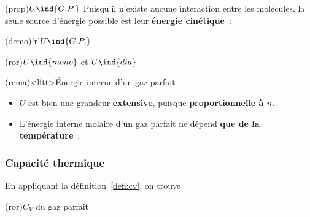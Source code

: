\documentclass[../../main/main.tex]{subfiles}
\begin{document}
\begin{tcbraster}[raster equal height=rows, raster columns=2]
	\begin{tcb*}(prop){$U\ind{G.P.}$}
		Puisqu'il n'existe aucune interaction entre les molécules, la seule source
		d'énergie possible est leur \textbf{énergie cinétique}~:
		\psw{%
			\[
				U = e_c + \underbracket[1pt]{e_p}_{=0}
				\Lra
				\boxed{U = \frac{D}{2} nRT}
				\quad
				R = k_B \Nc_A
			\]
		}%
		\vspace{-15pt}
	\end{tcb*}
	\begin{tcb*}(demo)'r'{$U\ind{G.P.}$}
		\vspace{-15pt}
	\end{tcb*}
\end{tcbraster}

\begin{tcb*}[sidebyside](ror){$U\ind{mono}$ et $U\ind{dia}$}
	\psw{%
		\[
			U\ind{mono} = \frac{3}{2}nRT
		\]
	}%
	\vspace{-15pt}
	\tcblower
	\psw{
		\[
			U\ind{dia} = \frac{5}{2}nRT
		\]
	}
	\vspace{-15pt}
\end{tcb*}

\begin{tcb}(rema)<lftt>{Énergie interne d'un gaz parfait}
	\begin{itemize}
		\item $U$ est bien une grandeur \textbf{extensive}, puisque
		      \textbf{proportionnelle à $n$}.
		\item L'énergie interne molaire d'un gaz parfait ne dépend \textbf{que de la
			      température}~:
		      \psw{%
			      \[
				      U_m = \frac{U}{n} = \frac{D}{2}RT
				      \Lra
				      \boxed{U_m = U_m(T)}
			      \]
		      }%
		      \vspace{-15pt}
	\end{itemize}
\end{tcb}

\subsubsection{Capacité thermique}
En appliquant la définition~\ref{defi:cv}, on trouve
\begin{tcb*}[sidebyside](ror){$C_V$ du gaz parfait}
	\psw{%
		\[
			C_{V} = \frac{3}{2}nR
			\Lra
			C_{V,m} = \frac{3}{2}R
		\]
	}%
	\vspace{-15pt}
	\tcblower
	\psw{
		\[
			C_V = \frac{5}{2}nRT
			\Lra
			C_{V,m} = \frac{5}{2}R
		\]
	}
	\vspace{-15pt}
\end{tcb*}
\end{document}
